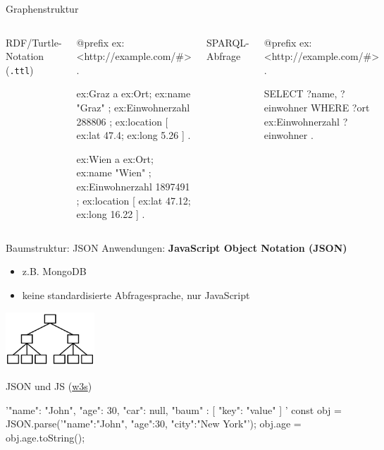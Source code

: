 \begin{frame}[fragile]{Graphenstruktur}
\begin{columns}[T,onlytextwidth]
    RDF/Turtle-Notation (\texttt{.ttl})
\begin{turtlecode}
@prefix ex: <http://example.com/#> .

ex:Graz a ex:Ort;  
ex:name "Graz" ; 
ex:Einwohnerzahl 288806 ; 
ex:location [ ex:lat 47.4; ex:long 5.26 ] .

ex:Wien a ex:Ort;  
ex:name "Wien" ; 
ex:Einwohnerzahl 1897491 ; 
ex:location [ ex:lat 47.12; ex:long 16.22 ] .
\end{turtlecode}

SPARQL-Abfrage
\begin{sparqlcode}
@prefix ex: <http://example.com/#> .

SELECT ?name, ?einwohner
WHERE {
    ?ort ex:Einwohnerzahl ?einwohner .
}
\end{sparqlcode}

  \end{columns}
\end{frame}


\begin{frame}[fragile]{Baumstruktur: JSON}
    Anwendungen: \textbf{JavaScript Object Notation (JSON)}
          \begin{itemize}\footnotesize
              \item z.B. MongoDB
              \item keine standardisierte Abfragesprache, nur JavaScript 
          \end{itemize}

\begin{block}{}      
\begin{flushright}
        \includegraphics[width=0.25\textwidth]{img/baumstruktur.png}
\end{flushright}
\end{block}

JSON und JS (\href{https://www.w3schools.com/js/js_json_intro.asp}{w3s})
\begin{jscode}
'{"name": "John", "age": 30, "car": null, 
  "baum" : [
    "key": "value"
  ]
}'
const obj = JSON.parse('{"name":"John", "age":30, "city":"New York"}');
obj.age = obj.age.toString();
\end{jscode}

\end{frame}


